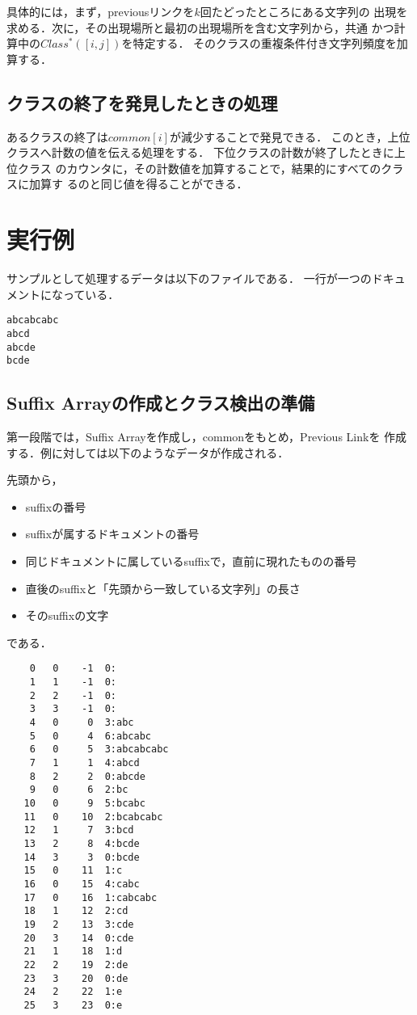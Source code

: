 具体的には，まず，previousリンクを$k$回たどったところにある文字列の
出現を求める．次に，その出現場所と最初の出現場所を含む文字列から，共通
かつ計算中の$Class^{\ast}([i,j])$を特定する．
そのクラスの重複条件付き文字列頻度を加算する．


\subsection{クラスの終了を発見したときの処理}

あるクラスの終了は$common[i]$が減少することで発見できる．
このとき，上位クラスへ計数の値を伝える処理をする．
下位クラスの計数が終了したときに上位クラス
のカウンタに，その計数値を加算することで，結果的にすべてのクラスに加算す
るのと同じ値を得ることができる．

\section{実行例}

サンプルとして処理するデータは以下のファイルである．
一行が一つのドキュメントになっている．

\begin{verbatim}
abcabcabc
abcd
abcde
bcde
\end{verbatim}

\subsection{Suffix Arrayの作成とクラス検出の準備}

第一段階では，Suffix Arrayを作成し，commonをもとめ，Previous Linkを
作成する．例に対しては以下のようなデータが作成される．

先頭から，
\begin{itemize}
 \item suffixの番号
 \item suffixが属するドキュメントの番号
 \item 同じドキュメントに属しているsuffixで，直前に現れたものの番号
 \item 直後のsuffixと「先頭から一致している文字列」の長さ
\item そのsuffixの文字
\end{itemize}
である．

\begin{verbatim}
    0   0    -1  0:
    1   1    -1  0:
    2   2    -1  0:
    3   3    -1  0:
    4   0     0  3:abc
    5   0     4  6:abcabc
    6   0     5  3:abcabcabc
    7   1     1  4:abcd
    8   2     2  0:abcde
    9   0     6  2:bc
   10   0     9  5:bcabc
   11   0    10  2:bcabcabc
   12   1     7  3:bcd
   13   2     8  4:bcde
   14   3     3  0:bcde
   15   0    11  1:c
   16   0    15  4:cabc
   17   0    16  1:cabcabc
   18   1    12  2:cd
   19   2    13  3:cde
   20   3    14  0:cde
   21   1    18  1:d
   22   2    19  2:de
   23   3    20  0:de
   24   2    22  1:e
   25   3    23  0:e
\end{verbatim}









